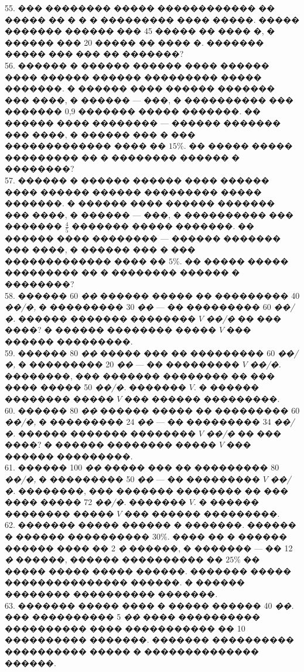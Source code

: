 \documentclass[12pt]{article}
\begin{document}
55. ��� �������� ����� ������������ �� ����� �� � � � ��������� ���� �����. ����� ������� ������ ��� 45 ����� �� ���� �, � ������ ��� 20 ����� �� ���� �. ������� ����� ��� ��� �� �������?\\
56. ������ � ������ ������ ���� ������ ���� ������ ������ ��������� ����� �������. � ������ ���� ������ ������� ��� ����, � ������ --- ���, � ���������� ��� ������� 0,9 ������� ����� �������. �� ������ ���� �������� --- ������ ������� ��� ����, � ������ ��� � ��� ������������� ���� �� $15\%.$ �� ����� ����� ��������� �� � �������� ������ � ��������?\\
57. ������ � ������ ������ ���� ������ ���� ������ ������ ��������� ����� �������. � ������ ���� ������ ������� ��� ����, � ������ --- ���, � ���������� ��� ������� $\frac{4}{5}$ ������� ����� �������. �� ������ ���� �������� --- ������ ������� ��� ����, � ������ ��� � ��� ������������� ���� �� $5\%.$ �� ����� ����� ��������� �� � �������� ������ � ��������?\\
58. ������ 60 {\it ��} ������ ����� �� ��������� 40 {\it ��/�,} � ��������� 30 {\it ��} --- �� ��������� 60 {\it ��/�.} ������ ������� �������� $V$ {\it ��/�} �� ��� ����? � ������ �������� ����� $V$ ��� ������ ���������.\\
59. ������ 80 {\it ��} ����� ��� �� ��������� 60 {\it ��/�,} � ��������� 20 {\it ��} --- �� ��������� $V$ {\it ��/�.} ��������, ��� ������� �������� �� ��� ���� ����� 50 {\it ��/�.} ������� $V.$ � ������ �������� ����� $V$ ��� ������ ���������.\\
60. ������ 80 {\it ��} ������ ����� �� ��������� 60 {\it ��/�,} � ��������� 24 {\it ��} --- �� ��������� 34 {\it ��/�.} ������ ������� �������� $V$ {\it ��/�} �� ��� ����? � ������ �������� ����� $V$ ��� ������ ���������.\\
61. ������ 100 {\it ��} ����� ��� �� ��������� 80 {\it ��/�,} � ��������� 50 {\it ��} --- �� ��������� $V$ {\it ��/�.} ��������, ��� ������� �������� �� ��� ���� ����� 72 {\it ��/�.} ������� $V.$ � ������ �������� ����� $V$ ��� ������ ���������.\\
62. ������� ����� ������ � �������. ������ � ������ ���������� $30\%.$ ���� �� � ������ ������ ���� �� 2 {\it �} ������, � ������� --- �� 12 {\it �} ������, ������ ���������� �� $25\%$ �� ����� ����� ����� ������. ������� ����� ��������������� ������. � ������ �������� ���������� �������.\\
63. ������� ����� ���� � ����� ������ 40 {\it ��.} ��� ���������� 5 {\it ��} ���� ���������� ���������� ���� ����������� �� 10 ���������� �������. ������� ���������� ���������� ����� � �������������� ������.\\
\end{document}
